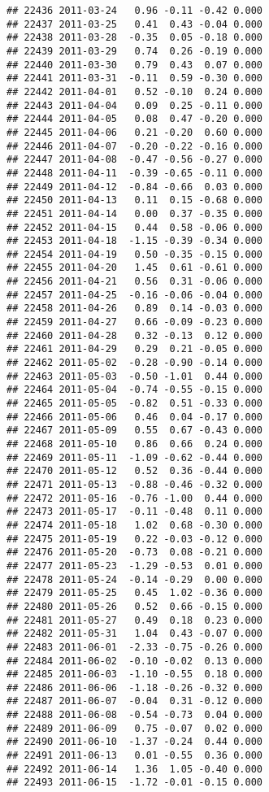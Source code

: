 \documentclass[
]{article}
\begin{document}
\begin{verbatim}
## 22436 2011-03-24   0.96 -0.11 -0.42 0.000
## 22437 2011-03-25   0.41  0.43 -0.04 0.000
## 22438 2011-03-28  -0.35  0.05 -0.18 0.000
## 22439 2011-03-29   0.74  0.26 -0.19 0.000
## 22440 2011-03-30   0.79  0.43  0.07 0.000
## 22441 2011-03-31  -0.11  0.59 -0.30 0.000
## 22442 2011-04-01   0.52 -0.10  0.24 0.000
## 22443 2011-04-04   0.09  0.25 -0.11 0.000
## 22444 2011-04-05   0.08  0.47 -0.20 0.000
## 22445 2011-04-06   0.21 -0.20  0.60 0.000
## 22446 2011-04-07  -0.20 -0.22 -0.16 0.000
## 22447 2011-04-08  -0.47 -0.56 -0.27 0.000
## 22448 2011-04-11  -0.39 -0.65 -0.11 0.000
## 22449 2011-04-12  -0.84 -0.66  0.03 0.000
## 22450 2011-04-13   0.11  0.15 -0.68 0.000
## 22451 2011-04-14   0.00  0.37 -0.35 0.000
## 22452 2011-04-15   0.44  0.58 -0.06 0.000
## 22453 2011-04-18  -1.15 -0.39 -0.34 0.000
## 22454 2011-04-19   0.50 -0.35 -0.15 0.000
## 22455 2011-04-20   1.45  0.61 -0.61 0.000
## 22456 2011-04-21   0.56  0.31 -0.06 0.000
## 22457 2011-04-25  -0.16 -0.06 -0.04 0.000
## 22458 2011-04-26   0.89  0.14 -0.03 0.000
## 22459 2011-04-27   0.66 -0.09 -0.23 0.000
## 22460 2011-04-28   0.32 -0.13  0.12 0.000
## 22461 2011-04-29   0.29  0.21 -0.05 0.000
## 22462 2011-05-02  -0.28 -0.90 -0.14 0.000
## 22463 2011-05-03  -0.50 -1.01  0.44 0.000
## 22464 2011-05-04  -0.74 -0.55 -0.15 0.000
## 22465 2011-05-05  -0.82  0.51 -0.33 0.000
## 22466 2011-05-06   0.46  0.04 -0.17 0.000
## 22467 2011-05-09   0.55  0.67 -0.43 0.000
## 22468 2011-05-10   0.86  0.66  0.24 0.000
## 22469 2011-05-11  -1.09 -0.62 -0.44 0.000
## 22470 2011-05-12   0.52  0.36 -0.44 0.000
## 22471 2011-05-13  -0.88 -0.46 -0.32 0.000
## 22472 2011-05-16  -0.76 -1.00  0.44 0.000
## 22473 2011-05-17  -0.11 -0.48  0.11 0.000
## 22474 2011-05-18   1.02  0.68 -0.30 0.000
## 22475 2011-05-19   0.22 -0.03 -0.12 0.000
## 22476 2011-05-20  -0.73  0.08 -0.21 0.000
## 22477 2011-05-23  -1.29 -0.53  0.01 0.000
## 22478 2011-05-24  -0.14 -0.29  0.00 0.000
## 22479 2011-05-25   0.45  1.02 -0.36 0.000
## 22480 2011-05-26   0.52  0.66 -0.15 0.000
## 22481 2011-05-27   0.49  0.18  0.23 0.000
## 22482 2011-05-31   1.04  0.43 -0.07 0.000
## 22483 2011-06-01  -2.33 -0.75 -0.26 0.000
## 22484 2011-06-02  -0.10 -0.02  0.13 0.000
## 22485 2011-06-03  -1.10 -0.55  0.18 0.000
## 22486 2011-06-06  -1.18 -0.26 -0.32 0.000
## 22487 2011-06-07  -0.04  0.31 -0.12 0.000
## 22488 2011-06-08  -0.54 -0.73  0.04 0.000
## 22489 2011-06-09   0.75 -0.07  0.02 0.000
## 22490 2011-06-10  -1.37 -0.24  0.44 0.000
## 22491 2011-06-13   0.01 -0.55  0.36 0.000
## 22492 2011-06-14   1.36  1.05 -0.40 0.000
## 22493 2011-06-15  -1.72 -0.01 -0.15 0.000

\end{verbatim}
\end{document}

